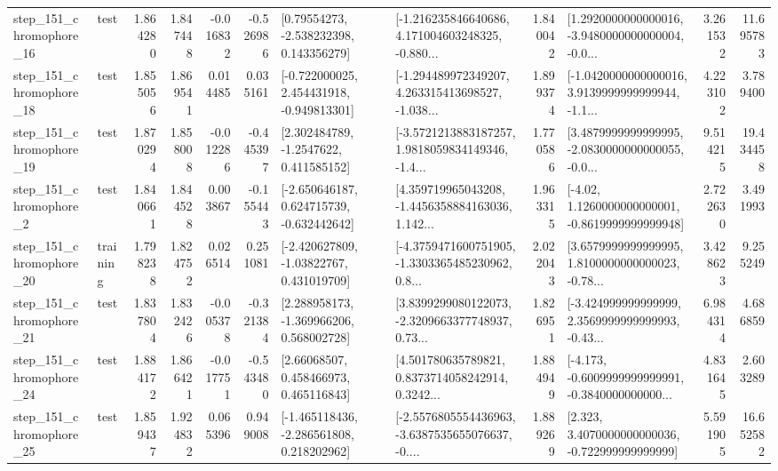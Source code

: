\begin{tabular}{llrrrrllrlrr}
  step\_151\_chromophore\_16 &      test &      1.864280 &    1.847448 &     -0.016832 & -0.526986 &     [0.79554273, -2.538232398, 0.143356279] &  [-1.216235846640686, 4.171004603248325, -0.880... &       1.840042 &  [1.2920000000000016, -3.9480000000000004, -0.0... &            3.261532 &         11.695783 \\
  step\_151\_chromophore\_18 &      test &      1.855056 &    1.869541 &      0.014485 &  0.035161 &   [-0.722000025, 2.454431918, -0.949813301] &  [-1.294489972349207, 4.263315413698527, -1.038... &       1.899374 &  [-1.0420000000000016, 3.9139999999999944, -1.1... &            4.223102 &          3.789400 \\
  step\_151\_chromophore\_19 &      test &      1.870294 &    1.858008 &     -0.012286 & -0.445397 &      [2.302484789, -1.2547622, 0.411585152] &  [-3.5721213883187257, 1.9818059834149346, -1.4... &       1.770586 &  [3.4879999999999995, -2.0830000000000055, -0.0... &            9.514215 &         19.434458 \\
   step\_151\_chromophore\_2 &      test &      1.840661 &    1.844528 &      0.003867 & -0.155443 &   [-2.650646187, 0.624715739, -0.632442642] &  [4.359719965043208, -1.4456358884163036, 1.142... &       1.963315 &   [-4.02, 1.1260000000000001, -0.8619999999999948] &            2.722630 &          3.491993 \\
  step\_151\_chromophore\_20 &  training &      1.798238 &    1.824752 &      0.026514 &  0.251081 &    [-2.420627809, -1.03822767, 0.431019709] &  [-4.3759471600751905, -1.3303365485230962, 0.8... &       2.022043 &  [3.6579999999999995, 1.8100000000000023, -0.78... &            3.428623 &          9.255249 \\
  step\_151\_chromophore\_21 &      test &      1.837804 &    1.832426 &     -0.005378 & -0.321384 &    [2.288958173, -1.369966206, 0.568002728] &  [3.8399299080122073, -2.3209663377748937, 0.73... &       1.826951 &  [-3.424999999999999, 2.3569999999999993, -0.43... &            6.984314 &          4.686859 \\
  step\_151\_chromophore\_24 &      test &      1.884172 &    1.866421 &     -0.017751 & -0.543480 &      [2.66068507, 0.458466973, 0.465116843] &  [4.501780635789821, 0.8373714058242914, 0.3242... &       1.884949 &  [-4.173, -0.6009999999999991, -0.3840000000000... &            4.831645 &          2.603289 \\
  step\_151\_chromophore\_25 &      test &      1.859437 &    1.924832 &      0.065396 &  0.949008 &   [-1.465118436, -2.286561808, 0.218202962] &  [-2.5576805554436963, -3.6387535655076637, -0.... &       1.889269 &    [2.323, 3.4070000000000036, -0.722999999999999] &            5.591905 &         16.652582 \\

\end{tabular}
